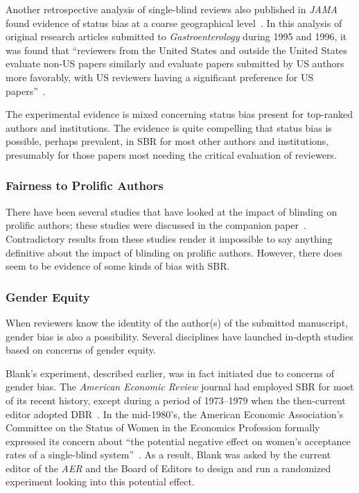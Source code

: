 \documentclass[acmtods,acmnow]{acmtrans2m}
\begin{document}
Another retrospective analysis of single-blind reviews also published in
{\em JAMA} found evidence of
status bias at a coarse geographical level~\cite{link98}. In this
analysis of original research articles submitted to {\em Gastroenterology}
during 1995 and 1996, it was found that ``reviewers from the United States
and outside the United States evaluate non-US papers similarly and evaluate
papers submitted by US authors more favorably, with US reviewers having a
significant preference for US papers''~\cite[page~246]{link98}.

The experimental evidence is mixed concerning status bias present for
top-ranked authors and institutions. The evidence is quite compelling that
status bias is possible, perhaps prevalent, in SBR for most other authors
and institutions, presumably for those papers most needing the critical
evaluation of reviewers.

\subsubsection{Fairness to Prolific Authors}

There have been several studies that have looked at the impact of blinding
on prolific authors; these studies were discussed in the companion
paper~\cite{DBR}. Contradictory results from these studies render it
impossible to say anything definitive about the impact of blinding on
prolific authors. However, there does seem to be evidence of some kinds of
bias with SBR.

\subsubsection{Gender Equity}

When reviewers know the identity of the author(s) of the submitted
manuscript, gender bias is also a possibility. Several disciplines have
launched in-depth studies based on concerns of gender equity.


Blank's experiment, described earlier, was in fact initiated due to concerns
of gender bias. The {\em American Economic Review} journal had employed SBR
for most of its recent history, except during a period of 1973--1979 when
the then-current editor adopted DBR~\cite{borts74}. In the mid-1980's, the
American Economic Association's Committee on the Status of Women in the
Economics Profession formally expressed its concern about ``the potential
negative effect on women's acceptance rates of a single-blind
system''~\cite[page~1045]{blank91}. As a result, Blank was asked by the
current editor of the {\em AER} and the Board of Editors to design and run a
randomized experiment looking into this potential effect.
\end{document}
